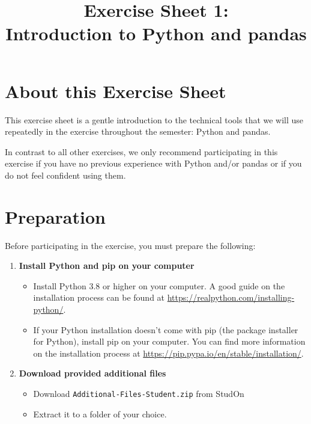 \documentclass[
english,
smallborders
]{i6prcsht}
\begin{document}
\title{Exercise Sheet 1: \\ Introduction to Python and pandas}
\maketitle
\vspace*{-2cm}

\section*{About this Exercise Sheet}

This exercise sheet is a gentle introduction to the technical tools that we will use repeatedly in the exercise throughout the semester: Python and pandas.

In contrast to all other exercises, we only recommend participating in this exercise if you have no previous experience with Python and/or pandas or if you do not feel confident using them.

\section*{Preparation}

Before participating in the exercise, you must prepare the following:

\begin{enumerate}
	\item \textbf{Install Python and pip on your computer}

	      \begin{itemize}
		      \item Install Python 3.8 or higher on your computer.
		            A good guide on the installation process can be found at \url{https://realpython.com/installing-python/}.
		      \item If your Python installation doesn't come with pip (the package installer for Python), install pip on your computer.
		            You can find more information on the installation process at \url{https://pip.pypa.io/en/stable/installation/}.
	      \end{itemize}

	\item \textbf{Download provided additional files}

	      \begin{itemize}
		      \item Download \texttt{Additional-Files-Student.zip} from StudOn
		      \item Extract it to a folder of your choice.
	      \end{itemize}

\end{enumerate}
\end{document}
